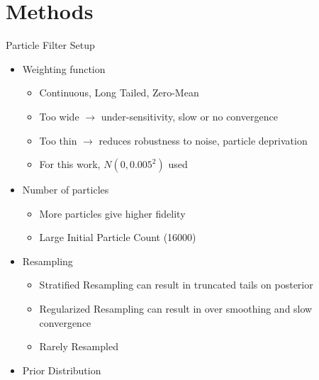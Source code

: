 \section{Methods}
\begin{frame}{Particle Filter Setup}
\begin{itemize}
    \item Weighting function
        \begin{itemize}
            \item Continuous, Long Tailed, Zero-Mean 
            \item Too wide $\rightarrow$ under-sensitivity, 
                slow or no convergence
            \item Too thin $\rightarrow$ reduces robustness 
                to noise, particle deprivation
            \item For this work, $N(0, 0.005^2)$ used
        \end{itemize}
    \item Number of particles
        \begin{itemize}
            \item More particles give higher fidelity 
            \item Large Initial Particle Count (16000)
        \end{itemize}
    \item Resampling 
        \begin{itemize}
            \item Stratified Resampling can result in truncated tails 
                    on posterior
            \item Regularized Resampling can result in over smoothing and 
                    slow convergence
            \item Rarely Resampled 
        \end{itemize}
    \item Prior Distribution
\end{itemize}
\end{frame}

